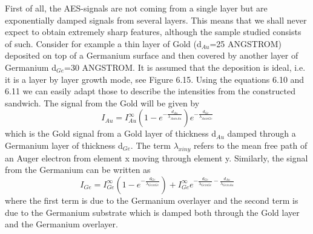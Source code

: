  First of all, the AES-signals are not coming from a single
 layer but are exponentially damped signals from several
 layers. This means that we shall never expect to obtain
 extremely sharp features, although the sample studied consists
 of such. Consider for example a thin layer of Gold
 (d$_{Au}$=25 ANGSTROM) deposited on top of a Germanium surface and
 then covered by another layer of Germanium d$_{Ge}$=30 ANGSTROM. It
 is assumed that the deposition is ideal, i.e. it is a layer
 by layer growth mode, see Figure 6.15. Using the equations
 6.10 and 6.11 we can easily adapt those to describe the
 intensities from the constructed sandwich. The signal from
 the Gold will be given by
 \begin{equation} I_{Au}=
 I^{\infty}_{Au}(1-e^{-\frac{d_{Au}}{\lambda_{Au in
 Au}}})e^{-\frac{d_{Ge}}{\lambda_{Au in Ge}}} \end{equation}
 which is the Gold signal from a Gold layer of thickness
 d$_{Au}$ damped through a Germanium layer of thickness
 d$_{Ge}$. The term $\lambda_{x in y}$ refers to the mean
 free path of an Auger electron from element x moving through
 element y. Similarly, the signal from the Germanium can be
 written as
\begin{equation}
 I_{Ge}= I^{\infty}_{Ge}(1-e^{-\frac{d_{Ge}}{\lambda_{Ge
 in Ge}}})+ I^{\infty}_{Ge}e^{-\frac{d_{Ge}}{\lambda_{Ge
 in Ge}}-\frac{d_{Au}}{\lambda_{Ge in Au}}} \end{equation}
 where the first term is due to the Germanium overlayer and
 the second term is due to the Germanium substrate which is
 damped both through the Gold layer and the Germanium
 overlayer.

